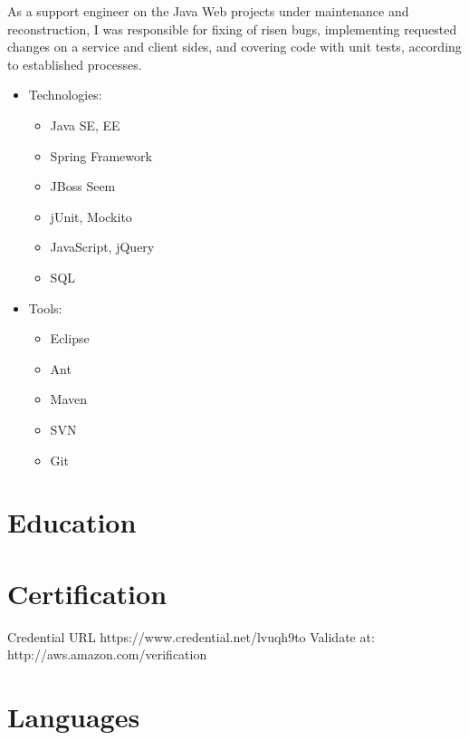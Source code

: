 \documentclass[11pt, a4paper]{moderncv}
\begin{document}
{As a support engineer on the Java Web projects under maintenance and reconstruction, I was responsible for fixing of risen bugs, implementing requested changes on a service and client sides, and covering code with unit tests, according to established processes.
\begin{itemize}
\item Technologies:
\begin{itemize}
\item Java SE, EE
\item Spring Framework
\item JBoss Seem
\item jUnit, Mockito
\item JavaScript, jQuery
\item SQL
\end{itemize}
\item Tools:
\begin{itemize}
\item Eclipse
\item Ant
\item Maven
\item SVN
\item Git
\end{itemize}
\end{itemize}}


\newpage

\section{Education}
{}
{}



\section{Certification}
{Credential URL https://www.credential.net/lvuqh9to}
{Validate at: http://aws.amazon.com/verification}

\section{Languages}
\end{document}
